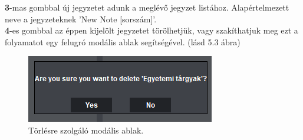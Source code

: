 \vspace{5pt} \noindent \textbf{3}-mas gombbal új jegyzetet adunk a meglévő jegyzet listához. Alapértelmezett neve a jegyzeteknek ’New Note [sorszám]’.
\vspace{5pt} \\ \textbf{4}-es gombbal az éppen kijelölt jegyzetet törölhetjük, vagy szakíthatjuk meg ezt a folyamatot egy felugró modális ablak segítségével. (lásd 5.3 ábra)

\begin{figure}[h]
	\centering
	\includegraphics[scale=0.7]{images/doc_3.png}
	\caption{Törlésre szolgáló modális ablak.}
	\label{fig:menu_notes_delete}
\end{figure}

